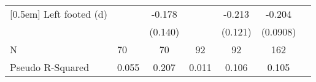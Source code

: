{\begin{tabularx}{\textwidth}{Xl*{5}{c}}
[0.5em]
Left footed (d)     &                     &      -0.178         &                     &      -0.213\sym{*}  &      -0.204\sym{**} \\
                    &                     &     (0.140)         &                     &     (0.121)         &    (0.0908)         \\
\hline
N                   &          70         &          70         &          92         &          92         &         162         \\
Pseudo R-Squared    &       0.055         &       0.207         &       0.011         &       0.106         &       0.105         \\
\hline\hline
\end{tabularx}
}

